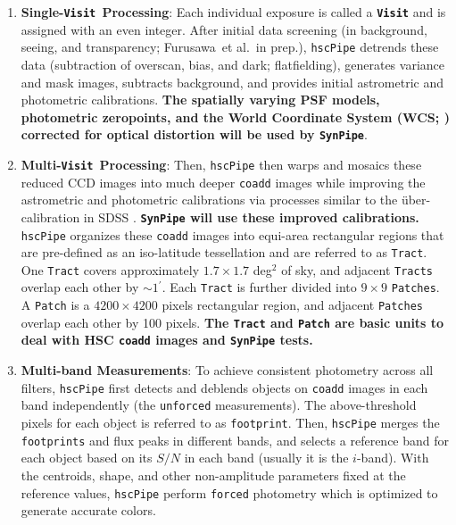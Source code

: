 \documentclass[useamsfonts]{pasj01}
\def\amin{$^\prime$}
\def\etal{{\ et al.~}}
\def\hscpipe{\texttt{hscPipe}}
\def\synpipe{\texttt{SynPipe}}
\def\forced{\texttt{forced}}
\def\unforced{\texttt{unforced}}
\def\tract{\texttt{Tract}}
\def\tracts{\texttt{Tracts}}
\newcommand{\term}[1]{\textbf{\texttt{#1}}}
\begin{document}
    \begin{enumerate}

        \item \textbf{Single-\texttt{Visit~}Processing}:
            Each individual exposure is called a \term{Visit} and is assigned with
            an even integer.
            After initial data screening (in background, seeing, and transparency;
            Furusawa\etal in prep.), \hscpipe{} detrends these data (subtraction
            of overscan, bias, and dark; flatfielding), generates variance and mask
            images, subtracts background, and provides initial astrometric and
            photometric calibrations.
            \textbf{The spatially varying PSF models, photometric zeropoints, and the
            World Coordinate System (WCS; \citealt{WCS1, WCS2}) corrected for optical
            distortion will be used by \synpipe{}}.

        \item \textbf{Multi-\texttt{Visit~}Processing}:
            Then, \hscpipe{} then warps and mosaics these reduced CCD images into
            much deeper \texttt{coadd} images while improving the astrometric and
            photometric calibrations via processes similar to the \"{u}ber-calibration
            in SDSS \citep{Padmanabhan2008}.
            \textbf{\synpipe{} will use these improved calibrations.}
            \hscpipe{} organizes these \texttt{coadd} images into equi-area
            rectangular regions that are pre-defined as an iso-latitude tessellation
            and are referred to as \tract{}.
            One \tract{} covers approximately $1.7\times 1.7$ deg$^2$ of
            sky, and adjacent \tracts{} overlap each other by ${\sim}1$\amin{}.
            Each \tract{} is further divided into $9\times9$ \texttt{Patches}.
            A \texttt{Patch} is a $4200\times4200$ pixels rectangular region, and
            adjacent \texttt{Patches} overlap each other by 100 pixels.
            \textbf{The \tract{} and \texttt{Patch} are basic units to deal
            with HSC \texttt{coadd} images and \synpipe{} tests.}

        \item \textbf{Multi-band Measurements}:
            To achieve consistent photometry across all filters, \hscpipe{} first
            detects and deblends objects on \texttt{coadd} images in each band
            independently (the \unforced{} measurements).
            The above-threshold pixels for each object is referred to as
            \texttt{footprint}.
            Then, \hscpipe{} merges the \texttt{footprints} and flux peaks in different
            bands, and selects a reference band for each object based on its $S/N$ in
            each band (usually it is the $i$-band).
            With the centroids, shape, and other non-amplitude parameters fixed at the
            reference values, \hscpipe{} perform \forced{} photometry which is
            optimized to generate accurate colors.


\end{enumerate}
\end{document}
